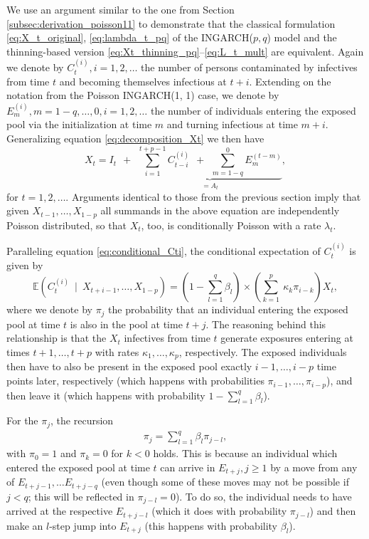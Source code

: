 \documentclass{article}
\begin{document}
We use an argument similar to the one from Section \ref{subsec:derivation_poisson11} to demonstrate that the classical formulation \eqref{eq:X_t_original}, \eqref{eq:lambda_t_pq} of the INGARCH($p, q$) model and the thinning-based version \eqref{eq:Xt_thinning_pq}--\eqref{eq:L_t_mult} are equivalent. Again we denote by $C_t^{(i)}, i = 1, 2, \dots$ the number of persons contaminated by infectives from time $t$ and becoming themselves infectious at $t + i$. Extending on the notation from the Poisson INGARCH(1, 1) case, we denote by $E^{(i)}_m, m = 1 - q, \dots, 0, i = 1, 2, \dots$ the number of individuals entering the exposed pool via the initialization at time $m$ and turning infectious at time $m + i$. Generalizing equation \eqref{eq:decomposition_Xt} we then have
$$
X_t = I_t \ \ + \ \ \underbrace{\sum_{i = 1}^{t + p - 1} C_{t - i}^{(i)} \ \ + \ \ \sum_{m = 1 - q}^0 E_m^{(t - m)}}_{= A_t},
$$
for $t = 1, 2, \dots$. Arguments identical to those from the previous section imply that given $X_{t - 1}, \dots, X_{1 - p}$ all summands in the above equation are independently Poisson distributed, so that $X_t$, too, is conditionally Poisson with a rate $\lambda_t$.

Paralleling equation \eqref{eq:conditional_Cti}, the conditional expectation of $C_t^{(i)}$ is given by
\begin{equation}
\mathbb{E}(C_t^{(i)} \ \mid \ X_{t + i - 1}, \dots, X_{1 - p}) = \left(1 - \sum_{l = 1}^q \beta_l \right) \times \left(\sum_{k = 1}^p\ \kappa_k \pi_{i - k}\right) X_t,\label{eq:ELt}
\end{equation}
where we denote by $\pi_j$ the probability that an individual entering the exposed pool at time $t$ is also in the pool at time $t + j$. The reasoning behind this relationship is that the $X_t$ infectives from time $t$ generate exposures entering at times $t + 1, \dots, t + p$ with rates $\kappa_1, \dots, \kappa_p$, respectively. The exposed individuals then have to also be present in the exposed pool exactly $i - 1, \dots, i - p$ time points later, respectively (which happens with probabilities $\pi_{i - 1}, \dots, \pi_{i - p}$), and then leave it (which happens with probability $1 - \sum_{l = 1}^q \beta_l$).

For the $\pi_j$, the recursion
\begin{align}
\pi_j = \sum_{l = 1}^q \beta_l \pi_{j - l}, \label{eq:recursion_pi}
\end{align}
with $\pi_0 = 1$ and $\pi_k = 0$ for $k < 0$ holds. This is because an individual which entered the exposed pool at time $t$ can arrive in $E_{t + j}, j \geq 1$ by a move from any of $E_{t + j - 1}, \dots E_{t + j - q}$ (even though some of these moves may not be possible if $j < q$; this will be reflected in $\pi_{j - l} = 0$). To do so, the individual needs to have arrived at the respective $E_{t + j - l}$ (which it does with probability $\pi_{j - l}$) and then make an $l$-step jump into $E_{t + j}$ (this happens with probability $\beta_l$).
\end{document}
